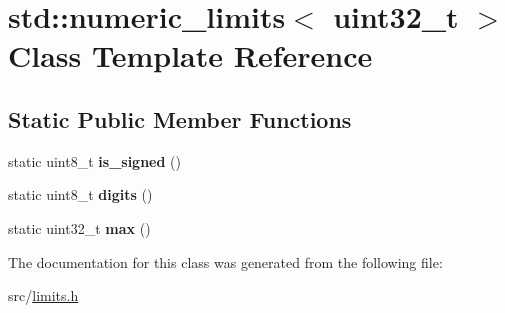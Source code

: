 \hypertarget{classstd_1_1numeric__limits_3_01uint32__t_01_4}{}\section{std\+:\+:numeric\+\_\+limits$<$ uint32\+\_\+t $>$ Class Template Reference}
\label{classstd_1_1numeric__limits_3_01uint32__t_01_4}
\subsection*{Static Public Member Functions}
\begin{DoxyCompactItemize}
\item 
\hypertarget{classstd_1_1numeric__limits_3_01uint32__t_01_4_a2c715b5f8e13692213b7c8d1337717e1}{}\label{classstd_1_1numeric__limits_3_01uint32__t_01_4_a2c715b5f8e13692213b7c8d1337717e1} 
static uint8\+\_\+t {\bfseries is\+\_\+signed} ()
\item 
\hypertarget{classstd_1_1numeric__limits_3_01uint32__t_01_4_a604671cc5e0cb48eb133906ba5e7fd33}{}\label{classstd_1_1numeric__limits_3_01uint32__t_01_4_a604671cc5e0cb48eb133906ba5e7fd33} 
static uint8\+\_\+t {\bfseries digits} ()
\item 
\hypertarget{classstd_1_1numeric__limits_3_01uint32__t_01_4_ab5d9839e9ca082865d042809aaf5c2d9}{}\label{classstd_1_1numeric__limits_3_01uint32__t_01_4_ab5d9839e9ca082865d042809aaf5c2d9} 
static uint32\+\_\+t {\bfseries max} ()
\end{DoxyCompactItemize}


The documentation for this class was generated from the following file\+:\begin{DoxyCompactItemize}
\item 
src/\hyperlink{limits_8h}{limits.\+h}\end{DoxyCompactItemize}
